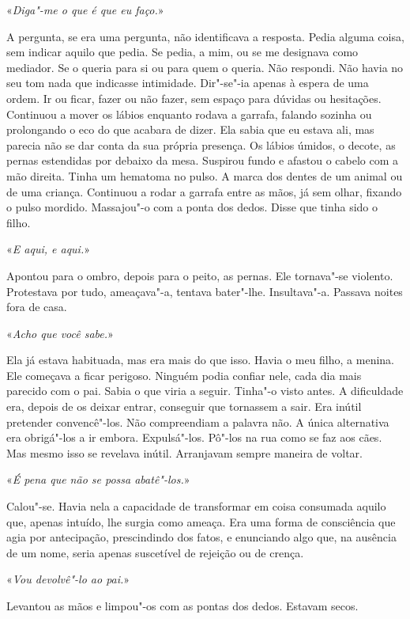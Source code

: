 «\emph{Diga"-me o que é que eu faço.}»

A pergunta, se era uma pergunta, não identificava a resposta. Pedia
alguma coisa, sem indicar aquilo que pedia. Se pedia, a mim, ou se me
designava como mediador. Se o queria para si ou para quem o queria. Não
respondi. Não havia no seu tom nada que indicasse intimidade.
Dir"-se"-ia apenas à espera de uma ordem. Ir ou ficar, fazer ou não
fazer, sem espaço para dúvidas ou hesitações. Continuou a mover os
lábios enquanto rodava a garrafa, falando sozinha ou prolongando o eco
do que acabara de dizer. Ela sabia que eu estava ali, mas parecia não se
dar conta da sua própria presença. Os lábios úmidos, o decote, as
pernas estendidas por debaixo da mesa. Suspirou fundo e afastou o cabelo
com a mão direita. Tinha um hematoma no pulso. A marca dos dentes de um
animal ou de uma criança. Continuou a rodar a garrafa entre as mãos, já
sem olhar, fixando o pulso mordido. Massajou"-o com a ponta dos dedos.
Disse que tinha sido o filho.

«\emph{E aqui, e aqui.}»

Apontou para o ombro, depois para o peito, as pernas. Ele tornava"-se
violento. Protestava por tudo, ameaçava"-a, tentava bater"-lhe.
Insultava"-a. Passava noites fora de casa.

«\emph{Acho que você sabe.}»

Ela já estava habituada, mas era mais do que isso. Havia o meu filho, a
menina. Ele começava a ficar perigoso. Ninguém podia confiar nele, cada
dia mais parecido com o pai. Sabia o que viria a seguir. Tinha"-o visto
antes. A dificuldade era, depois de os deixar entrar, conseguir que
tornassem a sair. Era inútil pretender convencê"-los. Não compreendiam a
palavra não. A única alternativa era obrigá"-los a ir embora.
Expulsá"-los. Pô"-los na rua como se faz aos cães. Mas mesmo isso se
revelava inútil. Arranjavam sempre maneira de voltar.

«\emph{É pena que não se possa abatê"-los.}»

Calou"-se. Havia nela a capacidade de transformar em coisa consumada
aquilo que, apenas intuído, lhe surgia como ameaça. Era uma forma de
consciência que agia por antecipação, prescindindo dos fatos, e
enunciando algo que, na ausência de um nome, seria apenas suscetível de
rejeição ou de crença.

«\emph{Vou devolvê"-lo ao pai.}»

Levantou as mãos e limpou"-os com as pontas dos dedos. Estavam secos.

